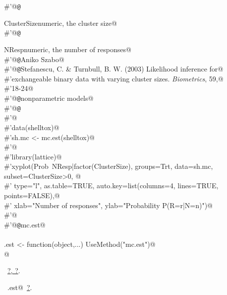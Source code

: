 \documentclass[reqno]{amsart}
\renewcommand{\NWlink}[2]{\hyperlink{#1}{#2}}
\begin{document}
\begin{flushleft}
\begin{minipage}{\linewidth}
\begin{list}{}{}
\mbox{}\verb@#'@{\tt @}\verb@return \item{ClusterSize}{numeric, the cluster size}@\\
\mbox{}\verb@#'@{\tt @}\verb@return \item{NResp}{numeric, the number of responses}@\\
\mbox{}\verb@#'@{\tt @}\verb@author Aniko Szabo@\\
\mbox{}\verb@#'@{\tt @}\verb@references Stefanescu, C. & Turnbull, B. W. (2003) Likelihood inference for@\\
\mbox{}\verb@#'exchangeable binary data with varying cluster sizes.  \emph{Biometrics}, 59,@\\
\mbox{}\verb@#'18-24@\\
\mbox{}\verb@#'@{\tt @}\verb@keywords nonparametric models@\\
\mbox{}\verb@#'@{\tt @}\verb@examples@\\
\mbox{}\verb@#'@\\
\mbox{}\verb@#'data(shelltox)@\\
\mbox{}\verb@#'sh.mc <- mc.est(shelltox)@\\
\mbox{}\verb@#'@\\
\mbox{}\verb@#'library(lattice)@\\
\mbox{}\verb@#'xyplot(Prob~NResp|factor(ClusterSize), groups=Trt, data=sh.mc, subset=ClusterSize>0, @\\
\mbox{}\verb@#'    type="l", as.table=TRUE, auto.key=list(columns=4, lines=TRUE, points=FALSE),@\\
\mbox{}\verb@#'    xlab="Number of responses", ylab="Probability P(R=r|N=n)")@\\
\mbox{}\verb@#'@\\
\mbox{}\verb@#'@{\tt @}\verb@name mc.est@\\
\mbox{}\verb@@\\
\mbox{}\verb@mc.est <- function(object,...) UseMethod("mc.est")@\\
\mbox{}\verb@ @\\
\mbox{}\verb@@{\NWsep}
\end{list}
\vspace{-1.5ex}
\footnotesize
\begin{list}{}{\setlength{\itemsep}{-\parsep}\setlength{\itemindent}{-\leftmargin}}
\item \NWtxtFileDefBy\ \NWlink{nuweb?}{?}\NWlink{nuweb?}{, ?}.
\item \NWtxtIdentsUsed\nobreak\  \verb@mc.est@\nobreak\ \NWlink{nuweb?}{?}.
\item{}
\end{list}
\end{minipage}\vspace{4ex}
\end{flushleft}
\end{document}
